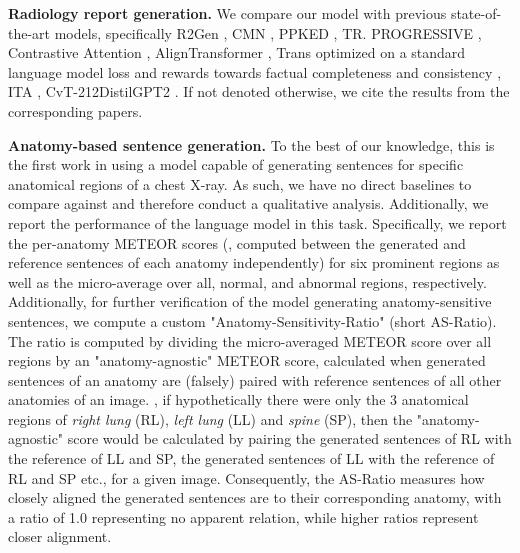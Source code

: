 \documentclass[10pt,twocolumn,letterpaper]{article}
\begin{document}
\begin{table*}[t!]
{\begin{tabular}{lllllll||lll}
		\end{tabular}
	}
	\caption{Clinical efficacy (CE) metrics micro-averaged over 5 observations (denoted by mic-5) and example-based averaged over 14 observations (denoted by ex-14). RL represents reinforcement learning. Our model outperforms all non-RL models by large margins and is competitive with the two RL-based models directly optimized on CE metrics. Dashed lines highlight the scores of the best non-RL baseline. Micro-averaged results of R2Gen cited from \cite{miura2021improving}, all example-based results are cited from \cite{nicolson2022improving}.}
	\label{tab:CE-metrics-total}
\end{table*}



\noindent\textbf{Radiology report generation.} We compare our model with previous state-of-the-art models, specifically R2Gen \cite{chen2020generating}, CMN \cite{chen2021cross}, PPKED \cite{liu2021exploring},  TR. PROGRESSIVE \cite{nooralahzadeh2021progressive}, Contrastive Attention \cite{liu2021contrastive}, AlignTransformer \cite{you2021aligntransformer},  Trans \cite{cornia2020meshed} optimized on a standard language model loss and rewards towards factual completeness and consistency \cite{miura2021improving}, ITA \cite{wang2022inclusive}, CvT-21{\large 2}DistilGPT2 \cite{nicolson2022improving}. If not denoted otherwise, we cite the results from the corresponding papers.

\noindent\textbf{Anatomy-based sentence generation.} To the best of our knowledge, this is the first work in using a model capable of generating sentences for specific anatomical regions of a chest X-ray. As such, we have no direct baselines to compare against and therefore conduct a qualitative analysis. Additionally, we report the performance of the language model in this task. Specifically, we report the per-anatomy METEOR scores (\ie, computed between the generated and reference sentences of each anatomy independently) for six prominent regions as well as the micro-average over all, normal, and abnormal regions, respectively. Additionally, for further verification of the model generating anatomy-sensitive sentences, we compute a custom "Anatomy-Sensitivity-Ratio" (short AS-Ratio). The ratio is computed by dividing the micro-averaged METEOR score over all regions by an "anatomy-agnostic" METEOR score, calculated when generated sentences of an anatomy are (falsely) paired with reference sentences of all other anatomies of an image. \Eg, if hypothetically there were only the 3 anatomical regions of \emph{right lung} (RL), \emph{left lung} (LL) and \emph{spine} (SP), then the "anatomy-agnostic" score would be calculated by pairing the generated sentences of RL with the reference of LL and SP, the generated sentences of LL with the reference of RL and SP etc., for a given image. Consequently, the AS-Ratio measures how closely aligned the generated sentences are to their corresponding anatomy, with a ratio of 1.0 representing no apparent relation, while higher ratios represent closer alignment.
\end{document}
